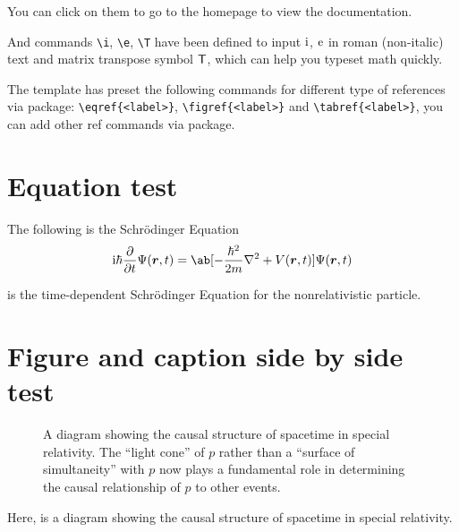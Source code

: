 You can click on them to go to the homepage to view the documentation.

And commands \verb|\i|, \verb|\e|, \verb|\T| have been defined to input 
$\mathrm i$, $\mathrm e$ in roman (non-italic) text and matrix transpose symbol $\mathsf T$, which can help you typeset math quickly.

The template has preset the following commands for different type of references via  package: \verb|\eqref{<label>}|, \verb|\figref{<label>}| and \verb|\tabref{<label>}|, you can add other ref commands via  package.

\section{Equation test}
The following is the Schr\"odinger Equation
\begin{equation}
    \i\hbar\pdv{}t\Psi(\bm r,t)=\ab[-\frac{\hbar^2}{2m}\nabla^2+V(\bm r,t)]\Psi(\bm r,t)
    \label{1.7.1}
\end{equation}

 is the time-dependent Schr\"odinger Equation for the nonrelativistic particle.

\section{Figure and caption side by side test}
\begin{figure}[htbp]
\begin{minipage}{.32\textwidth}
    \caption{A diagram showing the causal structure of spacetime in special relativity. The ``light cone'' of $p$ rather than a ``surface of simultaneity'' with $p$ now plays a fundamental role in determining the causal relationship of $p$ to other events.}
    \label{1.1}
\end{minipage}
\hfill
\begin{minipage}{.64\textwidth}
    \centering
\end{minipage}
\end{figure}

Here,  is a diagram showing the causal structure of spacetime in special relativity.